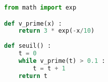 \begin{lstlisting}[language=python]
from math import exp

def v_prime(x) :
	return 3 * exp(-x/10)
	
def seuil() :
	t = 0
	while v_prime(t) > 0.1 :
		t = t + 1
	return t
\end{lstlisting}